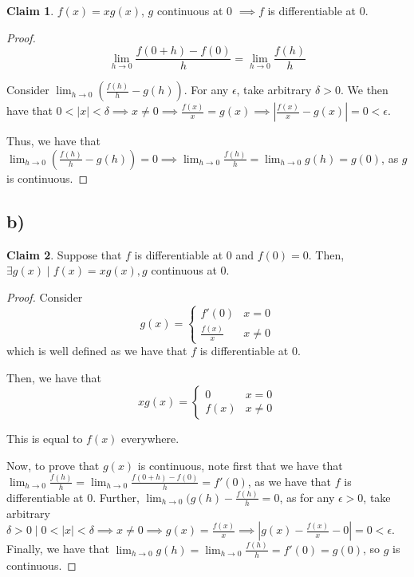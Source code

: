 \documentclass[12pt,letterpaper]{article}
\theoremstyle{definition}
\newtheorem*{claim}{Claim}
\begin{document}
\begin{claim}
  $f(x) = xg(x)$, $g$ continuous at 0 $\implies f$ is differentiable at $0$.
\end{claim}

\begin{proof}
  \[
    \lim_{h\rightarrow 0}\frac{f(0 + h) - f(0)}{h} = \lim_{h\rightarrow 0}\frac{f(h)}{h} 
  \]

  Consider $\lim_{h\rightarrow 0}(\frac{f(h)}{h} - g(h))$. For any $\epsilon$,
  take arbitrary $\delta > 0$. We then have that $0 < |x| < \delta \implies x
  \neq 0 \implies \frac{f(x)}{x} = g(x) \implies |\frac{f(x)}{x} - g(x)| = 0 < \epsilon$.

  Thus, we have that $\lim_{h\rightarrow 0} (\frac{f(h)}{h} - g(h)) = 0 \implies
  \lim_{h\rightarrow 0} \frac{f(h)}{h} = \lim_{h\rightarrow 0} g(h) = g(0)$, as
  $g$ is continuous.
\end{proof}

\subsection*{b)}

\begin{claim}
  Suppose that $f$ is differentiable at $0$ and $f(0) = 0$. Then, $\exists g(x)
  \mid f(x) = xg(x), g$ continuous at $0$.
\end{claim}

\begin{proof}
  Consider
  \[
    g(x) = \begin{cases}
      f'(0) & x = 0 \\
      \frac{f(x)}{x} & x \neq 0
    \end{cases}
  \]
  which is well defined as we have that $f$ is differentiable at 0.
  
  Then, we have that
  \[
    xg(x) = \begin{cases}
      0 & x = 0 \\
      f(x) & x \neq 0
    \end{cases}
  \]

  This is equal to $f(x)$ everywhere.

  Now, to prove that $g(x)$ is continuous, note first that we have that
  $\lim_{h\rightarrow 0} \frac{f(h)}{h} = \lim_{h\rightarrow 0}\frac{f(0 + h) -
    f(0)}{h} = f'(0)$, as we have that $f$ is differentiable at 0. Further,
  $\lim_{h\rightarrow 0} (g(h) - \frac{f(h)}{h} = 0$, as for any $\epsilon > 0$,
  take arbitrary $\delta > 0 \mid 0 < |x| < \delta \implies x \neq 0 \implies
  g(x) = \frac{f(x)}{x} \implies |g(x) - \frac{f(x)}{x} - 0| = 0 < \epsilon$.
  Finally, we have that $\lim_{h\rightarrow 0}g(h) = \lim_{h\rightarrow
    0}\frac{f(h)}{h} = f'(0) = g(0)$, so $g$ is continuous.
\end{proof}
\end{document}
